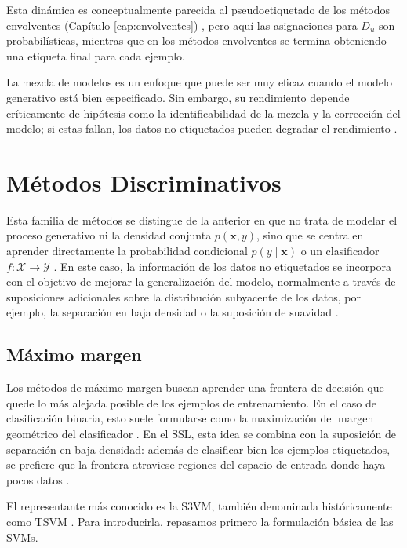 Esta dinámica es conceptualmente parecida al pseudoetiquetado de los métodos envolventes (Capítulo \ref{cap:envolventes}) \cite{zhu2009introduction,zhou2010semi}, pero aquí las asignaciones para $D_u$ son probabilísticas, mientras que en los métodos envolventes se termina obteniendo una etiqueta final para cada ejemplo.

La mezcla de modelos es un enfoque que puede ser muy eficaz cuando el modelo generativo está bien especificado. Sin embargo, su rendimiento depende críticamente de hipótesis como la identificabilidad de la mezcla y la corrección del modelo; si estas fallan, los datos no etiquetados pueden degradar el rendimiento \cite{zhu2005semi,van2020survey}.


\section{Métodos Discriminativos}

Esta familia de métodos se distingue de la anterior en que no trata de modelar el proceso generativo ni la densidad conjunta $p(\mathbf{x},y)$, sino que se centra en aprender directamente la probabilidad condicional $p(y\mid\mathbf{x})$ o un clasificador $f:\mathcal{X}\to\mathcal{Y}$ \cite{ng2001discriminative}. En este caso, la información de los datos no etiquetados se incorpora con el objetivo de mejorar la generalización del modelo, normalmente a través de suposiciones adicionales sobre la distribución subyacente de los datos, por ejemplo, la separación en baja densidad o la suposición de suavidad \cite{van2020survey}.
\subsection{Máximo margen}
\label{subsec:maximo_margen}

Los métodos de máximo margen buscan aprender una frontera de decisión que quede lo más alejada posible de los ejemplos de entrenamiento. En el caso de clasificación binaria, esto suele formularse como la maximización del margen geométrico del clasificador \cite{van2020survey}. En el \gls{SSL}, esta idea se combina con la suposición de separación en baja densidad: además de clasificar bien los ejemplos etiquetados, se prefiere que la frontera atraviese regiones del espacio de entrada donde haya pocos datos \cite{van2020survey,pmlr-v5-goldberg09a}.

El representante más conocido es la \gls{S3VM}, también denominada históricamente como \gls{TSVM} \cite{10.7551/mitpress/9780262033589.001.0001}. Para introducirla, repasamos primero la formulación básica de las \glspl{SVM}.

